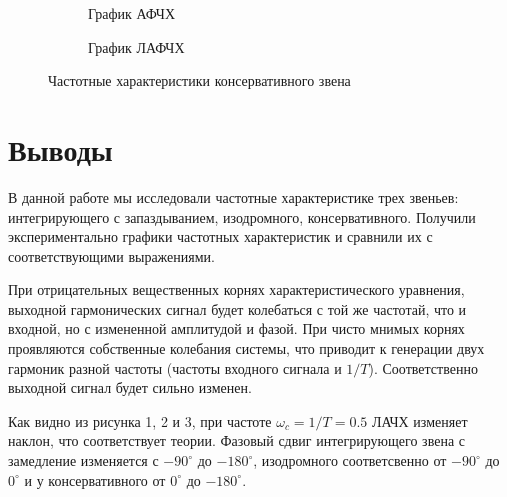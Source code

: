 \documentclass[a4paper, 12pt]{article}
\begin{document}
\begin{figure}[h!]
    \begin{subfigure}{0.5\textwidth}
        \centering
        \caption{График АФЧХ}
    \end{subfigure}
    \begin{subfigure}{0.5\textwidth}
        \centering
        \caption{График ЛАФЧХ}
    \end{subfigure}
    \caption{Частотные характеристики консервативного звена}
\end{figure}

\newpage
\section*{Выводы}
В данной работе мы исследовали частотные характеристике трех звеньев: интегрирующего с запаздыванием, изодромного, консервативного. Получили экспериментально графики частотных характеристик и сравнили их с соответствующими выражениями. \par
При отрицательных вещественных корнях характеристического уравнения, выходной гармонических сигнал будет колебаться с той же частотай, что и входной, но с измененной амплитудой и фазой. При чисто мнимых корнях проявляются собственные колебания системы, что приводит к генерации двух гармоник разной частоты (частоты входного сигнала и $1/T$). Соответственно выходной сигнал будет сильно изменен. \par
Как видно из рисунка 1, 2 и 3, при частоте $\omega_c = 1/T = 0.5$ ЛАЧХ изменяет наклон, что соответствует теории. Фазовый сдвиг интегрирующего звена с замедление изменяется с $-90^{\circ}$ до $-180^{\circ}$, изодромного соответсвенно от $-90^\circ$ до $0^\circ$ и у консервативного от $0^\circ$ до $-180^\circ$.
\end{document}
